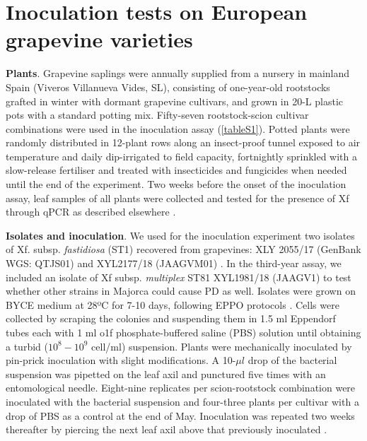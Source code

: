 \section{Inoculation tests on European grapevine
  varieties}\label{app:inoculations}

\textbf{Plants}. Grapevine saplings were annually supplied from a nursery in
mainland Spain (Viveros Villanueva Vides, SL), consisting of one-year-old
rootstocks grafted in winter with dormant grapevine cultivars, and grown in
20-L plastic pots with a standard potting mix. Fifty-seven rootstock-scion
cultivar combinations were used in the inoculation assay (\cref{tableS1}).
Potted plants were randomly distributed in 12-plant rows along an insect-proof
tunnel exposed to air temperature and daily dip-irrigated to field capacity,
fortnightly sprinkled with a slow-release fertiliser and treated with
insecticides and fungicides when needed until the end of the experiment. Two
weeks before the onset of the inoculation assay, leaf samples of all plants
were collected and tested for the presence of Xf through qPCR as described
elsewhere \cite{Moralejo2019}.

\noindent\textbf{Isolates and inoculation}. We used for the inoculation
experiment two isolates of Xf. subsp. \textit{fastidiosa} (ST1) recovered from
grapevines: XLY 2055/17 (GenBank WGS: QTJS01) and XYL2177/18 (JAAGVM01)
\cite{Gomila2019,Moralejo2020}. In the third-year assay, we included an isolate
of Xf subsp. \textit{multiplex} ST81 XYL1981/18 (JAAGV1) to test whether
other strains in Majorca could cause PD as well. Isolates were grown on BYCE
medium at 28ºC for 7-10 days, following EPPO protocols \cite{EPPO2018}.  Cells
were collected by scraping the colonies and suspending them in 1.5 ml Eppendorf
tubes each with 1 ml o1f phosphate-buffered saline (PBS) solution until
obtaining a turbid ($10^8-10^9$ cell/ml) suspension. Plants were mechanically
inoculated by pin-prick inoculation \cite{Almeida2003} with slight
modifications. A 10-$\mu l$ drop of the bacterial suspension was pipetted on
the leaf axil and punctured five times with an entomological needle.
Eight-nine replicates per scion-rootstock combination were inoculated with the
bacterial suspension and four-three plants per cultivar with a drop of PBS as a
control at the end of May. Inoculation was repeated two weeks thereafter by
piercing the next leaf axil above that previously inoculated
\cite{Moralejo2019}.\\

